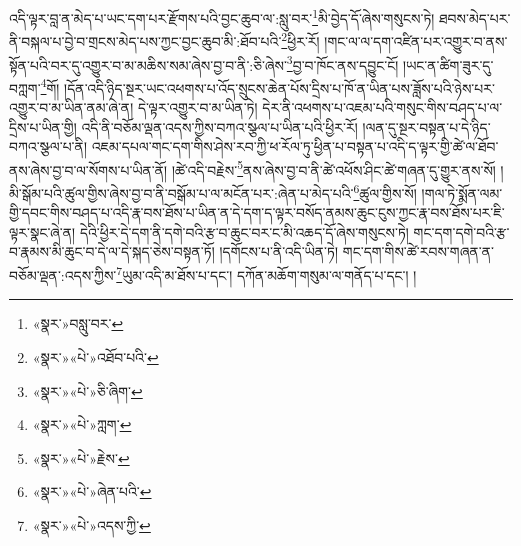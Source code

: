 འདི་ལྟར་བླ་ན་མེད་པ་ཡང་དག་པར་རྫོགས་པའི་བྱང་ཆུབ་ལ་:སླུ་བར་\footnote{«སྣར་»བསླུ་བར་}མི་བྱེད་དོ་ཞེས་གསུངས་ཏེ། ཐབས་མེད་པར་ནི་བསྐལ་པ་བྱེ་བ་གྲངས་མེད་པས་ཀྱང་བྱང་ཆུབ་མི་:ཐོབ་པའི་\footnote{«སྣར་»«པེ་»འཐོབ་པའི་}ཕྱིར་རོ། །གང་ལ་ལ་དག་འཛིན་པར་འགྱུར་བ་ནས་སྟོན་པའི་བར་དུ་འགྱུར་བ་མ་མཆིས་སམ་ཞེས་བྱ་བ་ནི་:ཅི་ཞེས་\footnote{«སྣར་»«པེ་»ཅི་ཞིག་}བྱ་བ་ཁོང་ནས་དབྱུང་ངོ། །ཡང་ན་ཚིག་ཟུར་དུ་བཀླག་\footnote{«སྣར་»«པེ་»ཀླག་}གོ། །དོན་འདི་ཉིད་སྔར་ཡང་འཕགས་པ་འོད་སྲུངས་ཆེན་པོས་དྲིས་པ་ཁོ་ན་ཡིན་པས་ཟློས་པའི་ཉེས་པར་འགྱུར་བ་མ་ཡིན་ནམ་ཞེ་ན། དེ་ལྟར་འགྱུར་བ་མ་ཡིན་ཏེ། དེར་ནི་འཕགས་པ་འཇམ་པའི་གསུང་གིས་བཤད་པ་ལ་དྲིས་པ་ཡིན་གྱི། འདི་ནི་བཅོམ་ལྡན་འདས་ཀྱིས་བཀའ་སྩལ་པ་ཡིན་པའི་ཕྱིར་རོ། །ལན་དུ་སྔར་བསྟན་པ་དེ་ཉིད་བཀའ་སྩལ་པ་ནི། འཇམ་དཔལ་གང་དག་གིས་ཤེས་རབ་ཀྱི་ཕ་རོལ་ཏུ་ཕྱིན་པ་བསྟན་པ་འདི་ད་ལྟར་གྱི་ཚེ་ལ་ཐོབ་ནས་ཞེས་བྱ་བ་ལ་སོགས་པ་ཡིན་ནོ། །ཚེ་འདི་བརྗེས་\footnote{«སྣར་»«པེ་»རྗེས་}ནས་ཞེས་བྱ་བ་ནི་ཚེ་འཕོས་ཤིང་ཚེ་གཞན་དུ་གྱུར་ནས་སོ། །མི་སྒོམ་པའི་ཚུལ་གྱིས་ཞེས་བྱ་བ་ནི་བསྒོམ་པ་ལ་མངོན་པར་:ཞེན་པ་མེད་པའི་\footnote{«སྣར་»«པེ་»ཞེན་པའི་}ཚུལ་གྱིས་སོ། །གལ་ཏེ་སྨོན་ལམ་གྱི་དབང་གིས་བཤད་པ་འདི་རྣ་བས་ཐོས་པ་ཡིན་ན་དེ་དག་ད་ལྟར་བསོད་ནམས་ཆུང་ངུས་ཀྱང་རྣ་བས་ཐོས་པར་ཇི་ལྟར་སྣང་ཞེ་ན། དེའི་ཕྱིར་དེ་དག་ནི་དགེ་བའི་རྩ་བ་ཆུང་བར་ང་མི་འཆད་དོ་ཞེས་གསུངས་ཏེ། གང་དག་དགེ་བའི་རྩ་བ་རྣམས་མི་ཆུང་བ་དེ་ལ་དེ་སྐད་ཅེས་བསྟན་ཏོ། །དགོངས་པ་ནི་འདི་ཡིན་ཏེ། གང་དག་གིས་ཚེ་རབས་གཞན་ན་བཅོམ་ལྡན་:འདས་ཀྱིས་\footnote{«སྣར་»«པེ་»འདས་ཀྱི་}ཡུམ་འདི་མ་ཐོས་པ་དང་། དཀོན་མཆོག་གསུམ་ལ་གནོད་པ་དང་། །
